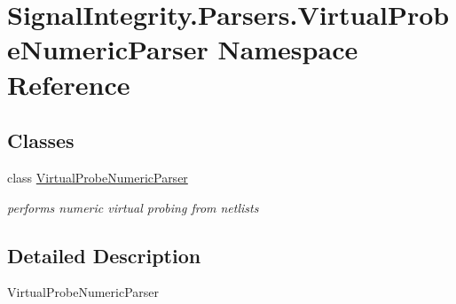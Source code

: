 \hypertarget{namespaceSignalIntegrity_1_1Parsers_1_1VirtualProbeNumericParser}{}\section{Signal\+Integrity.\+Parsers.\+Virtual\+Probe\+Numeric\+Parser Namespace Reference}
\label{namespaceSignalIntegrity_1_1Parsers_1_1VirtualProbeNumericParser}
\subsection*{Classes}
\begin{DoxyCompactItemize}
\item 
class \hyperlink{classSignalIntegrity_1_1Parsers_1_1VirtualProbeNumericParser_1_1VirtualProbeNumericParser}{Virtual\+Probe\+Numeric\+Parser}
\begin{DoxyCompactList}\small\item\em performs numeric virtual probing from netlists \end{DoxyCompactList}\end{DoxyCompactItemize}


\subsection{Detailed Description}
\begin{DoxyVerb}VirtualProbeNumericParser\end{DoxyVerb}
 